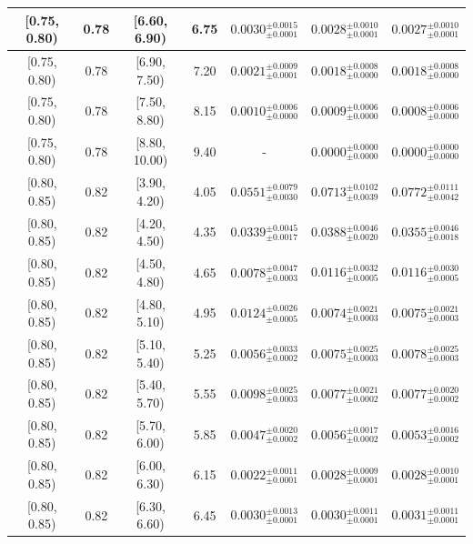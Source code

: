 \begin{longtable}{|c|c|c|c|c|c|c|}
\hline
[0.75, 0.80) & 0.78 & [6.60, 6.90) & 6.75 & $0.0030^{ \pm 0.0015 }_{ \pm 0.0001 }$ & $0.0028^{ \pm 0.0010 }_{ \pm 0.0001 }$ & $0.0027^{ \pm 0.0010 }_{ \pm 0.0001 }$ \\ 
\hline
[0.75, 0.80) & 0.78 & [6.90, 7.50) & 7.20 & $0.0021^{ \pm 0.0009 }_{ \pm 0.0001 }$ & $0.0018^{ \pm 0.0008 }_{ \pm 0.0000 }$ & $0.0018^{ \pm 0.0008 }_{ \pm 0.0000 }$ \\ 
\hline
[0.75, 0.80) & 0.78 & [7.50, 8.80) & 8.15 & $0.0010^{ \pm 0.0006 }_{ \pm 0.0000 }$ & $0.0009^{ \pm 0.0006 }_{ \pm 0.0000 }$ & $0.0008^{ \pm 0.0006 }_{ \pm 0.0000 }$ \\ 
\hline
[0.75, 0.80) & 0.78 & [8.80, 10.00) & 9.40 & - & $0.0000^{ \pm 0.0000 }_{ \pm 0.0000 }$ & $0.0000^{ \pm 0.0000 }_{ \pm 0.0000 }$ \\ 
\hline
[0.80, 0.85) & 0.82 & [3.90, 4.20) & 4.05 & $0.0551^{ \pm 0.0079 }_{ \pm 0.0030 }$ & $0.0713^{ \pm 0.0102 }_{ \pm 0.0039 }$ & $0.0772^{ \pm 0.0111 }_{ \pm 0.0042 }$ \\ 
\hline
[0.80, 0.85) & 0.82 & [4.20, 4.50) & 4.35 & $0.0339^{ \pm 0.0045 }_{ \pm 0.0017 }$ & $0.0388^{ \pm 0.0046 }_{ \pm 0.0020 }$ & $0.0355^{ \pm 0.0046 }_{ \pm 0.0018 }$ \\ 
\hline
[0.80, 0.85) & 0.82 & [4.50, 4.80) & 4.65 & $0.0078^{ \pm 0.0047 }_{ \pm 0.0003 }$ & $0.0116^{ \pm 0.0032 }_{ \pm 0.0005 }$ & $0.0116^{ \pm 0.0030 }_{ \pm 0.0005 }$ \\ 
\hline
[0.80, 0.85) & 0.82 & [4.80, 5.10) & 4.95 & $0.0124^{ \pm 0.0026 }_{ \pm 0.0005 }$ & $0.0074^{ \pm 0.0021 }_{ \pm 0.0003 }$ & $0.0075^{ \pm 0.0021 }_{ \pm 0.0003 }$ \\ 
\hline
[0.80, 0.85) & 0.82 & [5.10, 5.40) & 5.25 & $0.0056^{ \pm 0.0033 }_{ \pm 0.0002 }$ & $0.0075^{ \pm 0.0025 }_{ \pm 0.0003 }$ & $0.0078^{ \pm 0.0025 }_{ \pm 0.0003 }$ \\ 
\hline
[0.80, 0.85) & 0.82 & [5.40, 5.70) & 5.55 & $0.0098^{ \pm 0.0025 }_{ \pm 0.0003 }$ & $0.0077^{ \pm 0.0021 }_{ \pm 0.0002 }$ & $0.0077^{ \pm 0.0020 }_{ \pm 0.0002 }$ \\ 
\hline
[0.80, 0.85) & 0.82 & [5.70, 6.00) & 5.85 & $0.0047^{ \pm 0.0020 }_{ \pm 0.0002 }$ & $0.0056^{ \pm 0.0017 }_{ \pm 0.0002 }$ & $0.0053^{ \pm 0.0016 }_{ \pm 0.0002 }$ \\ 
\hline
[0.80, 0.85) & 0.82 & [6.00, 6.30) & 6.15 & $0.0022^{ \pm 0.0011 }_{ \pm 0.0001 }$ & $0.0028^{ \pm 0.0009 }_{ \pm 0.0001 }$ & $0.0028^{ \pm 0.0010 }_{ \pm 0.0001 }$ \\ 
\hline
[0.80, 0.85) & 0.82 & [6.30, 6.60) & 6.45 & $0.0030^{ \pm 0.0013 }_{ \pm 0.0001 }$ & $0.0030^{ \pm 0.0011 }_{ \pm 0.0001 }$ & $0.0031^{ \pm 0.0011 }_{ \pm 0.0001 }$ \\ 

\end{longtable}

